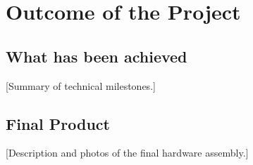 \section{Outcome of the Project}

\subsection{What has been achieved}
[Summary of technical milestones.]

\subsection{Final Product}
[Description and photos of the final hardware assembly.]

